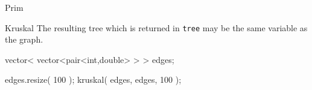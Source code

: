 
\begin{algorithm}{Prim}
\end{algorithm}

\begin{algorithm}{Kruskal}
\desc
The resulting tree which is returned in {\tt tree} may
be the same variable as the graph.
\begin{example}
	vector< vector<pair<int,double> > > edges;

	edges.resize( 100 );
	kruskal( edges, edges, 100 );
\end{example}
\end{algorithm}
